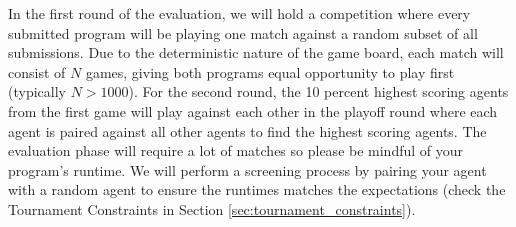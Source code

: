 \documentclass[twoside,11pt]{article}
\begin{document}
In the first round of the evaluation, we will hold a competition where every submitted program will be playing one match against a random subset of all submissions. Due to the deterministic nature of the game board, each match will consist of $N$ games, giving both programs equal opportunity to play first (typically $N>1000$). For the second round, the 10 percent highest scoring agents from the first game will play against each other in the playoff round where each agent is paired against all other agents to find the highest scoring agents. The evaluation phase will require a lot of matches so please be mindful of your program’s runtime. We will perform a screening process by pairing your agent with a random agent to ensure the runtimes matches the expectations (check the Tournament Constraints in Section \ref{sec:tournament_constraints}).
\end{document}
